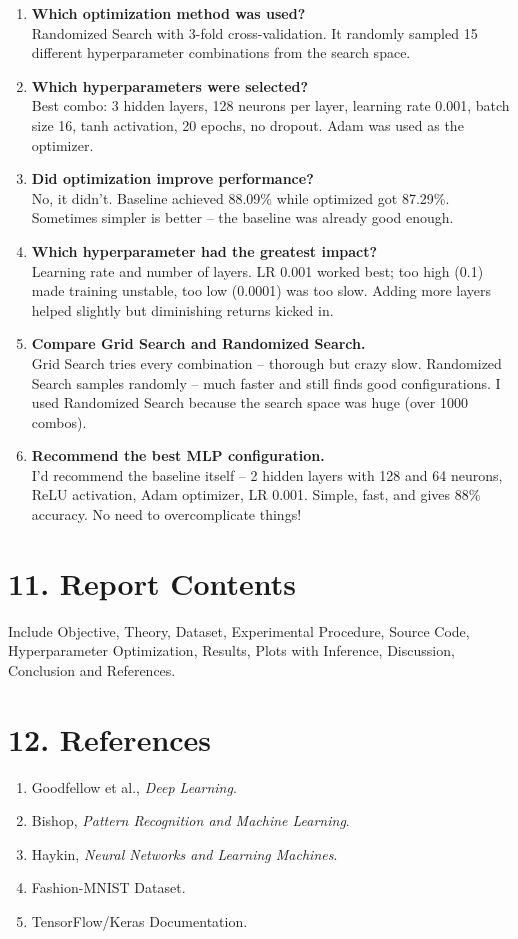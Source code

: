 \documentclass[11pt]{article}
\begin{document}
\begin{enumerate}
    \item \textbf{Which optimization method was used?} \\
    Randomized Search with 3-fold cross-validation. It randomly sampled 15 different hyperparameter combinations from the search space.

    \item \textbf{Which hyperparameters were selected?} \\
    Best combo: 3 hidden layers, 128 neurons per layer, learning rate 0.001, batch size 16, tanh activation, 20 epochs, no dropout. Adam was used as the optimizer.

    \item \textbf{Did optimization improve performance?} \\
    No, it didn't. Baseline achieved 88.09\% while optimized got 87.29\%. Sometimes simpler is better – the baseline was already good enough.

    \item \textbf{Which hyperparameter had the greatest impact?} \\
    Learning rate and number of layers. LR 0.001 worked best; too high (0.1) made training unstable, too low (0.0001) was too slow. Adding more layers helped slightly but diminishing returns kicked in.

    \item \textbf{Compare Grid Search and Randomized Search.} \\
    Grid Search tries every combination – thorough but crazy slow. Randomized Search samples randomly – much faster and still finds good configurations. I used Randomized Search because the search space was huge (over 1000 combos).

    \item \textbf{Recommend the best MLP configuration.} \\
    I'd recommend the baseline itself – 2 hidden layers with 128 and 64 neurons, ReLU activation, Adam optimizer, LR 0.001. Simple, fast, and gives 88\% accuracy. No need to overcomplicate things!
\end{enumerate}

\section*{11. Report Contents}

Include Objective, Theory, Dataset, Experimental Procedure, Source Code, Hyperparameter Optimization, Results, Plots with Inference, Discussion, Conclusion and References.

\section*{12. References}
\begin{enumerate}
\item Goodfellow et al., \emph{Deep Learning}.
\item Bishop, \emph{Pattern Recognition and Machine Learning}.
\item Haykin, \emph{Neural Networks and Learning Machines}.
\item Fashion-MNIST Dataset.
\item TensorFlow/Keras Documentation.
\end{enumerate}
\end{document}
